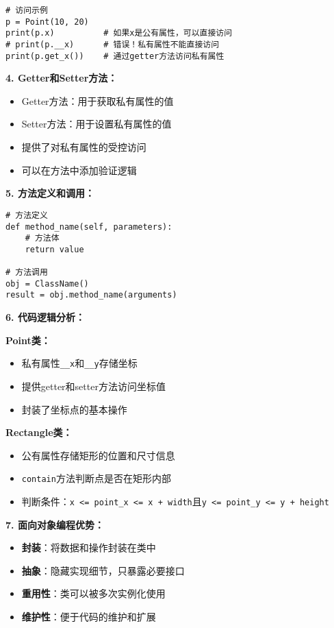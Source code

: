 \begin{mdframed}
\begin{lstlisting}
# 访问示例
p = Point(10, 20)
print(p.x)          # 如果x是公有属性，可以直接访问
# print(p.__x)      # 错误！私有属性不能直接访问
print(p.get_x())    # 通过getter方法访问私有属性
  \end{lstlisting}

  \textbf{4. Getter和Setter方法：}
  \begin{itemize}
    \item Getter方法：用于获取私有属性的值
    \item Setter方法：用于设置私有属性的值
    \item 提供了对私有属性的受控访问
    \item 可以在方法中添加验证逻辑
  \end{itemize}

  \textbf{5. 方法定义和调用：}
  \begin{lstlisting}
# 方法定义
def method_name(self, parameters):
    # 方法体
    return value

# 方法调用
obj = ClassName()
result = obj.method_name(arguments)
  \end{lstlisting}

  \textbf{6. 代码逻辑分析：}

  \textbf{Point类：}
  \begin{itemize}
    \item 私有属性\texttt{\_\_x}和\texttt{\_\_y}存储坐标
    \item 提供getter和setter方法访问坐标值
    \item 封装了坐标点的基本操作
  \end{itemize}

  \textbf{Rectangle类：}
  \begin{itemize}
    \item 公有属性存储矩形的位置和尺寸信息
    \item \texttt{contain}方法判断点是否在矩形内部
    \item 判断条件：\texttt{x <= point\_x <= x + width}且\texttt{y <= point\_y <= y + height}
  \end{itemize}

  \textbf{7. 面向对象编程优势：}
  \begin{itemize}
    \item \textbf{封装}：将数据和操作封装在类中
    \item \textbf{抽象}：隐藏实现细节，只暴露必要接口
    \item \textbf{重用性}：类可以被多次实例化使用
    \item \textbf{维护性}：便于代码的维护和扩展
  \end{itemize}


\end{mdframed}
